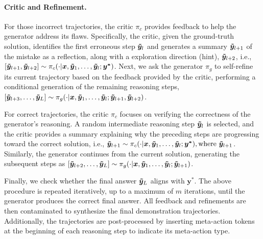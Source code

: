 \paragraph{Critic and Refinement.}
For those incorrect trajectories, the critic $\pi_c$ provides feedback to help the generator address its flaws. Specifically, the critic, given the ground-truth solution, identifies the first erroneous step $\boldsymbol{\Tilde{y}}_{l}$ and generates a summary $\boldsymbol{\Tilde{y}}_{l+1}$ of the mistake as a reflection, along with a exploration direction (hint), $\boldsymbol{\Tilde{y}}_{l+2}$, i.e., $[\boldsymbol{\Tilde{y}}_{l+1}, \boldsymbol{\Tilde{y}}_{l+2}] \sim \pi_c(\cdot | \boldsymbol{x}, \boldsymbol{\Tilde{y}}_{1}, \ldots, \boldsymbol{\Tilde{y}}_{l}; \boldsymbol{y^*})$. Next, we ask the generator $\pi_g$ to self-refine its current trajectory based on the feedback provided by the critic, performing a conditional generation of the remaining reasoning steps, $[\boldsymbol{\Tilde{y}}_{l+3}, \ldots, \boldsymbol{\Tilde{y}}_{L}] \sim \pi_g(\cdot | \boldsymbol{x}, \boldsymbol{\Tilde{y}}_{1}, \ldots, \boldsymbol{\Tilde{y}}_{l}; \boldsymbol{\Tilde{y}}_{l+1}, \boldsymbol{\Tilde{y}}_{l+2})$. 

For correct trajectories, the critic $\pi_c$ focuses on verifying the correctness of the generator’s reasoning. A random intermediate reasoning step $\boldsymbol{\Tilde{y}}_{l}$ is selected, and the critic provides a summary explaining why the preceding steps are progressing toward the correct solution, i.e., $\boldsymbol{\Tilde{y}}_{l+1} \sim \pi_c(\cdot | \boldsymbol{x}, \boldsymbol{\Tilde{y}}_{1}, \ldots, \boldsymbol{\Tilde{y}}_{l}; \boldsymbol{y^*}), \text{where} \ \boldsymbol{\Tilde{y}}_{l+1}$. Similarly, the generator continues from the current solution, generating the subsequent steps as $[\boldsymbol{\Tilde{y}}_{l+2}, \ldots, \boldsymbol{\Tilde{y}}_{L}] \sim \pi_g(\cdot | \boldsymbol{x}, \boldsymbol{\Tilde{y}}_{1}, \ldots, \boldsymbol{\Tilde{y}}_{l}; \boldsymbol{\Tilde{y}}_{l+1})$.

Finally, we check whether the final answer $\boldsymbol{\Tilde{y}}_{L}$ aligns with $\boldsymbol{y^*}$. The above procedure is repeated iteratively, up to a maximum of $m$ iterations, until the generator produces the correct final answer. All feedback and refinements are then contaminated to synthesize the final demonstration trajectories. Additionally, the trajectories are post-processed by inserting meta-action tokens at the beginning of each reasoning step to indicate its meta-action type.

